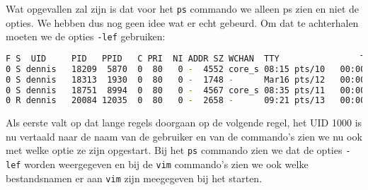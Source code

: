 Wat opgevallen zal zijn is dat voor het \texttt{ps} commando we alleen ps zien en niet de opties. We hebben dus nog geen idee wat er echt gebeurd. Om dat te achterhalen moeten we de opties \texttt{-lef} gebruiken:
\begin{lstlisting}[language=bash]
F S  UID     PID   PPID   C PRI  NI ADDR SZ WCHAN  TTY                TIME CMD
0 S dennis   18209  5870  0  80   0 -  4552 core_s 08:15 pts/10   00:00:00 vim src/Linux_deel2_CLI.tex
0 S dennis   18313  1930  0  80   0 -  1748 -      Mar16 pts/12   00:00:00 bash
0 S dennis   18751  8994  0  80   0 -  4567 core_s 08:35 pts/11   00:00:07 vim src/processen.tex
0 R dennis   20084 12035  0  80   0 -  2658 -      09:21 pts/13   00:00:00 ps -lef
\end{lstlisting}
Als eerste valt op dat lange regels doorgaan op de volgende regel, het UID 1000 is nu vertaald naar de naam van de gebruiker en van de commando's zien we nu ook met welke optie ze zijn opgestart. Bij het \texttt{ps} commando zien we dat de opties \texttt{-lef} worden weergegeven en bij de \texttt{vim} commando's zien we ook welke bestandsnamen er aan \texttt{vim} zijn meegegeven bij het starten.
